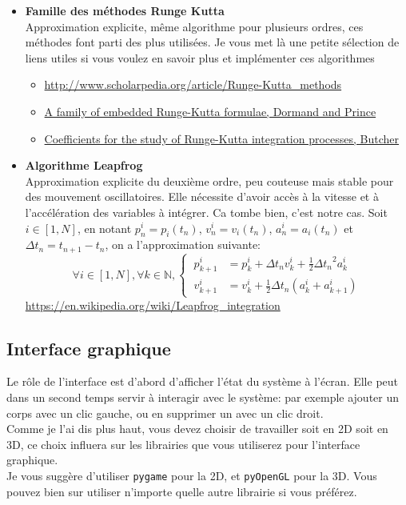\documentclass{article}
\begin{document}
\begin{itemize}
    \item \textbf{Famille des méthodes Runge Kutta} \\
    Approximation explicite, même algorithme pour plusieurs ordres, ces méthodes font parti des plus utilisées. Je vous met là une petite sélection de liens utiles si vous voulez en savoir plus et implémenter ces algorithmes
    \begin{itemize}
        \item \url{http://www.scholarpedia.org/article/Runge-Kutta_methods}
        \item \href{https://core.ac.uk/download/pdf/81989096.pdf}{A family of embedded Runge-Kutta formulae, Dormand and Prince}
        \item \href{https://www.researchgate.net/publication/231910159_Coefficients_for_the_study_of_Runge-Kutta_integration_processes}{Coefficients for the study of Runge-Kutta integration processes, Butcher}
    \end{itemize}


    \item \textbf{Algorithme Leapfrog} \\
    Approximation explicite du deuxième ordre, peu couteuse mais stable pour des mouvement oscillatoires. Elle nécessite d'avoir accès à la vitesse et à l'accélération des variables à intégrer. Ca tombe bien, c'est notre cas. Soit $i \in [1,N]$, en notant $p^i_n = p_i(t_n)$, $v^i_n = v_i(t_n)$, $a^i_n = a_i(t_n)$ et $\Delta t_n = t_{n+1} - t_n$, on a l'approximation suivante:
    \begin{equation*}
        \forall i \in [1,N], \forall k \in \mathbb{N}, \left\{\begin{aligned}
            \ p^i_{k+1} & = p^i_k + \Delta t_n v^i_k + \frac{1}{2}{\Delta t_n}^2 a^i_k\\
            \ v^i_{k+1} & = v^i_k + \frac{1}{2}\Delta t_n(a^i_k + a^i_{k+1})
        \end{aligned}\right.
    \end{equation*}
    \url{https://en.wikipedia.org/wiki/Leapfrog_integration}
\end{itemize}

\subsection{Interface graphique}
\label{interface}

Le rôle de l'interface est d'abord d'afficher l'état du système à l'écran. Elle peut dans un second temps servir à interagir avec le système: par exemple ajouter un corps avec un clic gauche, ou en supprimer un avec un clic droit.\\
Comme je l'ai dis plus haut, vous devez choisir de travailler soit en 2D soit en 3D, ce choix influera sur les librairies que vous utiliserez pour l'interface graphique.\\
Je vous suggère d'utiliser \verb!pygame! pour la 2D, et \verb!pyOpenGL! pour la 3D. Vous pouvez bien sur utiliser n'importe quelle autre librairie si vous préférez.
\end{document}
